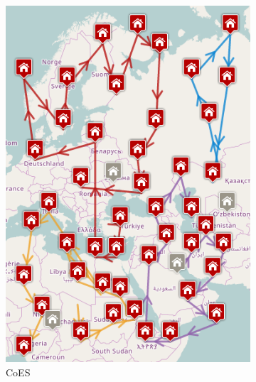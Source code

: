 \begin{figure}[!]
    \centering
    \begin{subfigure}[t]{0.5\textwidth}
        \centering
		\includegraphics[width=\textwidth]{../../Resources/Images/test_result_normal_cordeau_coes}
		\caption{CoES}
		\label{fig:test_result_normal_cordeau_pubsub_coes}
    \end{subfigure}%
    ~ 
    \begin{subfigure}[t]{0.5\textwidth}
        \centering

\end{subfigure}
\end{figure}
